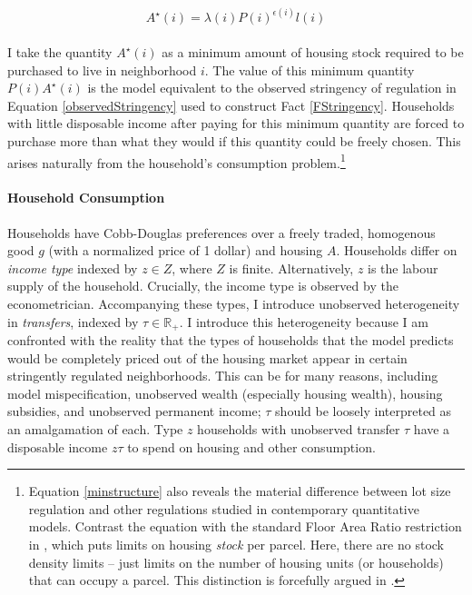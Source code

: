 \documentclass[]{article}
\begin{document}
\begin{equation}\label{minstructure}
	A^{\star}(i) = \lambda(i)P(i)^{\epsilon(i)}l(i)
\end{equation}

\paragraph*{}
I take the quantity $A^{\star}(i)$ as a minimum amount of housing stock required to be purchased to live in neighborhood $i$. The value of this minimum quantity $P(i)A^{\star}(i)$ is the model equivalent to the observed stringency of regulation in Equation \eqref{observedStringency} used to construct Fact \ref{FStringency}. Households with little disposable income after paying for this minimum quantity are forced to purchase more than what they would if this quantity could be freely chosen. This arises naturally from the household's consumption problem.\footnote{Equation \eqref{minstructure} also reveals the material difference between lot size regulation and other regulations studied in contemporary quantitative models. Contrast the equation with the standard Floor Area Ratio restriction in \cite{bruecknersingh}, which puts limits on housing \textit{stock} per parcel. Here, there are no stock density  limits -- just limits on the number of housing units (or households) that can occupy a parcel. This distinction is forcefully argued in \cite{griesonwhite}.}

\paragraph*{Household Consumption}
Households have Cobb-Douglas preferences over a freely traded, homogenous good $g$ (with a normalized price of 1 dollar) and housing $A$. Households differ on \textit{income type} indexed by $z \in Z$, where $Z$ is finite. Alternatively, $z$ is the labour supply of the household. Crucially, the income type is observed by the econometrician. Accompanying these types, I introduce unobserved heterogeneity in \textit{transfers}, indexed by $\tau \in \mathbb{R}_{+}$.  I introduce this heterogeneity because I am confronted with the reality that the types of households that the model predicts would be completely priced out of the housing market appear in certain stringently regulated neighborhoods.  This can be for many reasons, including model mispecification, unobserved wealth (especially housing wealth), housing subsidies, and unobserved permanent income; $\tau$ should be loosely interpreted as an amalgamation of each. Type $z$ households with unobserved transfer $\tau$ have a disposable income $z\tau$ to spend on housing and other consumption.
\end{document}
